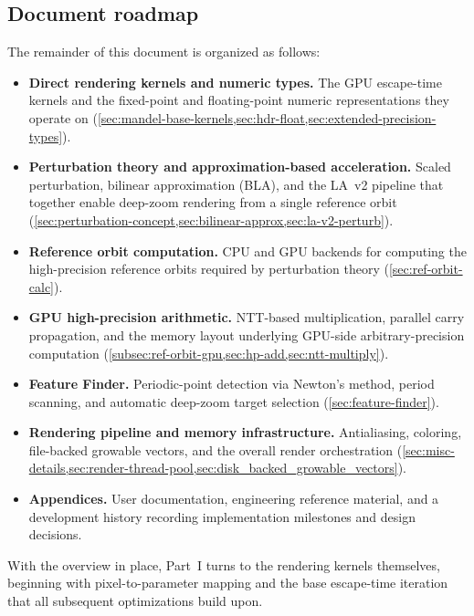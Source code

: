 \subsection*{Document roadmap}

The remainder of this document is organized as follows:
\begin{itemize}
  \item \textbf{Direct rendering kernels and numeric types.}
        The GPU escape-time kernels and the fixed-point and floating-point
        numeric representations they operate on
        (\cref{sec:mandel-base-kernels,sec:hdr-float,sec:extended-precision-types}).
  \item \textbf{Perturbation theory and approximation-based acceleration.}
        Scaled perturbation, bilinear approximation (BLA), and the LA~v2
        pipeline that together enable deep-zoom rendering from a single
        reference orbit
        (\cref{sec:perturbation-concept,sec:bilinear-approx,sec:la-v2-perturb}).
  \item \textbf{Reference orbit computation.}
        CPU and GPU backends for computing the high-precision reference orbits
        required by perturbation theory (\cref{sec:ref-orbit-calc}).
  \item \textbf{GPU high-precision arithmetic.}
        NTT-based multiplication, parallel carry propagation, and the
        memory layout underlying GPU-side arbitrary-precision computation
        (\cref{subsec:ref-orbit-gpu,sec:hp-add,sec:ntt-multiply}).
  \item \textbf{Feature Finder.}
        Periodic-point detection via Newton's method, period scanning, and
        automatic deep-zoom target selection (\cref{sec:feature-finder}).
  \item \textbf{Rendering pipeline and memory infrastructure.}
        Antialiasing, coloring, file-backed growable vectors, and the overall
        render orchestration (\cref{sec:misc-details,sec:render-thread-pool,sec:disk_backed_growable_vectors}).
  \item \textbf{Appendices.}
        User documentation, engineering reference material, and a development
        history recording implementation milestones and design decisions.
\end{itemize}

With the overview in place, Part~I turns to the rendering kernels themselves,
beginning with pixel-to-parameter mapping and the base escape-time iteration
that all subsequent optimizations build upon.
